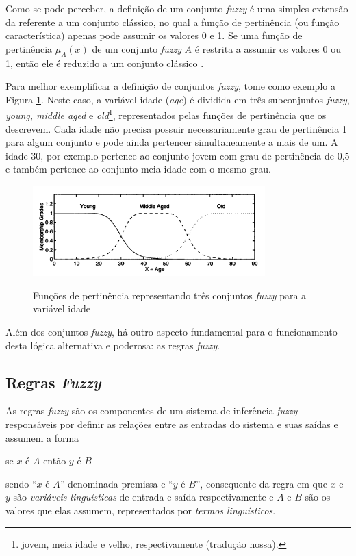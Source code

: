 Como se pode perceber, a definição de um conjunto \textit{fuzzy} é uma simples extensão da referente a um conjunto clássico, no qual a função de pertinência (ou função característica) apenas pode assumir os valores 0 e 1. Se uma função de pertinência $\mu_A(x)$ de um conjunto \textit{fuzzy} $A$ é restrita a assumir os valores 0 ou 1, então ele é reduzido a um conjunto clássico \cite[p.~14]{Jang1997}.

Para melhor exemplificar a definição de conjuntos \textit{fuzzy}, tome como exemplo a Figura \ref{fig:fuzzy_sets_jang}. Neste caso, a variável idade (\textit{age}) é dividida em três subconjuntos \textit{fuzzy}, \textit{young, middle aged} e \textit{old}\footnote{jovem, meia idade e velho, respectivamente (tradução nossa).}, representados pelas funções de pertinência que os descrevem. Cada idade não precisa possuir necessariamente grau de pertinência 1 para algum conjunto e pode ainda pertencer simultaneamente a mais de um. A idade 30, por exemplo pertence ao conjunto jovem com grau de pertinência de 0,5 e também pertence ao conjunto meia idade com o mesmo grau.

\begin{figure}[!htb]
    \centering
    \caption{Funções de pertinência representando três conjuntos \textit{fuzzy} para a variável idade}
    \includegraphics[width=0.8\textwidth]{./04-figuras/fund_teorica/fuzzy_sets_jang}
    \label{fig:fuzzy_sets_jang}
\end{figure}

Além dos conjuntos \textit{fuzzy}, há outro aspecto fundamental para o funcionamento desta lógica alternativa e poderosa: as regras \textit{fuzzy}.

\subsection{Regras \textit{Fuzzy}}
\label{sec:regras_fuzzy}

As regras \textit{fuzzy} são os componentes de um sistema de inferência \textit{fuzzy} responsáveis por definir as relações entre as entradas do sistema e suas saídas e assumem a forma
\begin{center}
se $x$ é $A$ então $y$ é $B$
\end{center}
sendo ``$x$ é $A$'' denominada premissa  e ``$y$ é $B$'', consequente da regra em que $x$ e $y$ são \textit{variáveis linguísticas} de entrada e saída respectivamente  e $A$ e $B$ são os valores que elas assumem, representados por \textit{termos linguísticos}.

